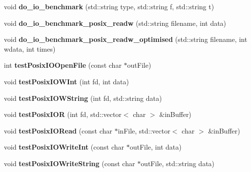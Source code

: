 \begin{DoxyCompactItemize}
void {\bfseries do\+\_\+io\+\_\+benchmark} (std\+::string type, std\+::string f, std\+::string t)
\item 
\mbox{\label{classtest_1_1ReadWriteTest_a124b7dcc73b42db25246ea952e9983a5}} 
void {\bfseries do\+\_\+io\+\_\+benchmark\+\_\+posix\+\_\+readw} (std\+::string filename, int data)
\item 
\mbox{\label{classtest_1_1ReadWriteTest_a4ac2f3956d82b479a73f34ac5ab0748d}} 
void {\bfseries do\+\_\+io\+\_\+benchmark\+\_\+posix\+\_\+readw\+\_\+optimised} (std\+::string filename, int wdata, int times)
\item 
\mbox{\label{classtest_1_1ReadWriteTest_a7941b98a99b6c33051defa05fbe3c361}} 
int {\bfseries test\+Posix\+I\+O\+Open\+File} (const char $\ast$out\+File)
\item 
\mbox{\label{classtest_1_1ReadWriteTest_a41cd008f760cfba015e9cbea5926da76}} 
void {\bfseries test\+Posix\+I\+O\+W\+Int} (int fd, int data)
\item 
\mbox{\label{classtest_1_1ReadWriteTest_a799a361704d8067d71e53b608cb7b66d}} 
void {\bfseries test\+Posix\+I\+O\+W\+String} (int fd, std\+::string data)
\item 
\mbox{\label{classtest_1_1ReadWriteTest_af0398f00c9d6a49d5829da33167b08ba}} 
void {\bfseries test\+Posix\+I\+OR} (int fd, std\+::vector$<$ char $>$ \&in\+Buffer)
\item 
\mbox{\label{classtest_1_1ReadWriteTest_aa55cc699f13fe87cee5b1a1eb0c7e395}} 
void {\bfseries test\+Posix\+I\+O\+Read} (const char $\ast$in\+File, std\+::vector$<$ char $>$ \&in\+Buffer)
\item 
\mbox{\label{classtest_1_1ReadWriteTest_a75498812264aac8bbf7accaf271c1f77}} 
void {\bfseries test\+Posix\+I\+O\+Write\+Int} (const char $\ast$out\+File, int data)
\item 
\mbox{\label{classtest_1_1ReadWriteTest_a0f9984877a45347002ff41abfb29fc1d}} 
void {\bfseries test\+Posix\+I\+O\+Write\+String} (const char $\ast$out\+File, std\+::string data)
\end{DoxyCompactItemize}
